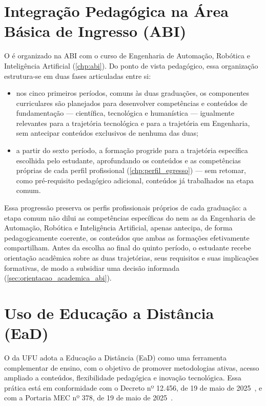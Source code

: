 \section{Integração Pedagógica na Área Básica de Ingresso (ABI)}
\label{sec:integracao_pedagogica_abi}

O \ppccurso é organizado na ABI com o curso de Engenharia de Automação, Robótica e Inteligência Artificial (\autoref{chp:abi}). Do ponto de vista pedagógico, essa organização estrutura-se em duas fases articuladas entre si:

\begin{itemize}
    \item nos cinco primeiros períodos, comuns às duas graduações, os componentes curriculares são planejados para desenvolver competências e conteúdos de fundamentação — científica, tecnológica e humanística — igualmente relevantes para a trajetória tecnológica e para a trajetória em Engenharia, sem antecipar conteúdos exclusivos de nenhuma das duas;
    \item a partir do sexto período, a formação progride para a trajetória específica escolhida pelo estudante, aprofundando os conteúdos e as competências próprias de cada perfil profissional (\autoref{chp:perfil_egresso}) — sem retomar, como pré-requisito pedagógico adicional, conteúdos já trabalhados na etapa comum.
\end{itemize}

Essa progressão preserva os perfis profissionais próprios de cada graduação: a etapa comum não dilui as competências específicas do \ppccurso nem as da Engenharia de Automação, Robótica e Inteligência Artificial, apenas antecipa, de forma pedagogicamente coerente, os conteúdos que ambas as formações efetivamente compartilham. Antes da escolha ao final do quinto período, o estudante recebe orientação acadêmica sobre as duas trajetórias, seus requisitos e suas implicações formativas, de modo a subsidiar uma decisão informada (\autoref{sec:orientacao_academica_abi}).

\section{Uso de Educação a Distância (EaD)}
\label{sec:ead}

O \ppccurso da UFU adota a Educação a Distância (EaD) como uma ferramenta complementar de ensino, com o objetivo de promover metodologias ativas, acesso ampliado a conteúdos, flexibilidade pedagógica e inovação tecnológica. Essa prática está em conformidade com o Decreto nº 12.456, de 19 de maio de 2025~\cite{mec_decreto_ead_12456_2025}, e com a Portaria MEC nº 378, de 19 de maio de 2025~\cite{mec_portaria_378_2025}.

